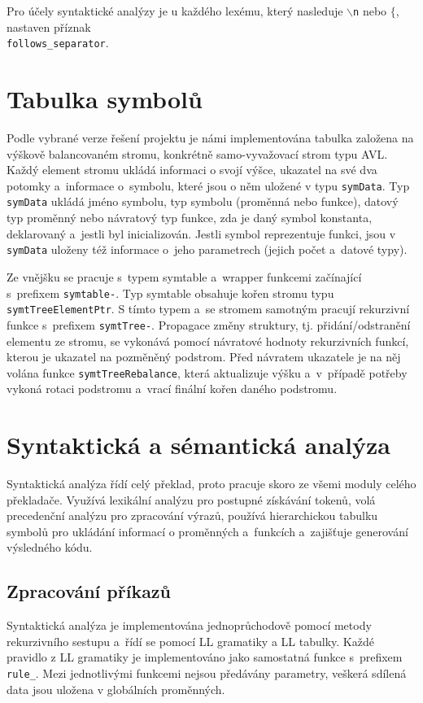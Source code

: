 \documentclass[11pt]{article}
\begin{document}
Pro účely syntaktické analýzy je u každého lexému, který nasleduje \texttt{$\backslash$n} nebo \texttt{$\{$}, nastaven příznak\\ \texttt{follows\_separator}.







\section{Tabulka symbolů}
Podle vybrané verze řešení projektu je námi implementována tabulka založena na výškově balancovaném stromu,
konkrétně samo-vyvažovací strom typu AVL. Každý element stromu ukládá informaci o svojí výšce, ukazatel na své dva potomky a~informace
o~symbolu, které jsou o něm uložené v typu \texttt{symData}. Typ \texttt{symData} ukládá jméno symbolu, typ symbolu (proměnná nebo funkce),
datový typ proměnný nebo návratový typ funkce, zda je daný symbol konstanta, deklarovaný a~jestli byl inicializován.
Jestli symbol reprezentuje funkci, jsou v \texttt{symData} uloženy též informace o~jeho parametrech (jejich počet a~datové typy).

Ze vnějšku se pracuje s~typem symtable a~wrapper funkcemi začínající s~prefixem \texttt{symtable-}.
Typ symtable obsahuje kořen stromu typu \texttt{symtTreeElementPtr}. S tímto typem a~se 
stromem samotným pracují rekurzivní funkce s~prefixem \texttt{symtTree-}.
Propagace změny struktury, tj. přidání/odstranění elementu ze stromu, se vykonává pomocí návratové
hodnoty rekurzivních funkcí, kterou je ukazatel na pozměněný podstrom.
Před návratem ukazatele je na něj volána funkce \texttt{symtTreeRebalance}, která aktualizuje výšku a~v~případě
potřeby vykoná rotaci podstromu a~vrací finální kořen daného podstromu.

\section{Syntaktická a sémantická analýza}
Syntaktická analýza řídí celý překlad, proto pracuje skoro ze všemi moduly celého překladače.
Využívá lexikální analýzu pro postupné získávání tokenů, volá precedenční analýzu pro zpracování
výrazů, používá hierarchickou tabulku symbolů pro ukládání informací o proměnných a~funkcích a~zajišťuje generování výsledného kódu.


\subsection{Zpracování příkazů}
Syntaktická analýza je implementována jednoprůchodově pomocí metody rekurzivního sestupu
a~řídí se pomocí LL gramatiky a LL tabulky. Každé pravidlo z LL gramatiky je implementováno
jako samostatná funkce s~prefixem \texttt{rule\_}. 
Mezi jednotlivými funkcemi nejsou předávány parametry, veškerá sdílená data jsou uložena v globálních proměnných.
\end{document}
